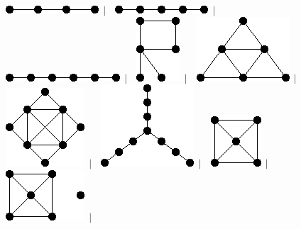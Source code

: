 \documentclass[11pt,paper=b5,footinclude,headinclude]{scrbook} %
\newtheorem{ex}{Vaja\hypertarget{sol:\theex}}[chapter]
\begin{document}
\begin{ex}
\begin{figure}
\includegraphics[scale=0.5]{smallGraphs/g_P4.png}$\,\mid\,$\
\includegraphics[scale=0.5]{smallGraphs/g_P5.png}$\,\mid\,$\
\includegraphics[scale=0.5]{smallGraphs/g_P6.png}$\,\mid\,$\
\includegraphics[scale=0.5]{smallGraphs/g_R.png}$\,\mid\,$\
\includegraphics[scale=0.5]{smallGraphs/g_S3.png}$\,\mid\,$\
\includegraphics[scale=0.5]{smallGraphs/g_S4.png}$\,\mid\,$\
\includegraphics[scale=0.5]{smallGraphs/g_T3.png}$\,\mid\,$\
\includegraphics[scale=0.5]{smallGraphs/g_W4.png}$\,\mid\,$\
\includegraphics[scale=0.5]{smallGraphs/g_W4UK1.png}$\,\mid\,$\

\end{figure}
\end{ex}
\end{document}
